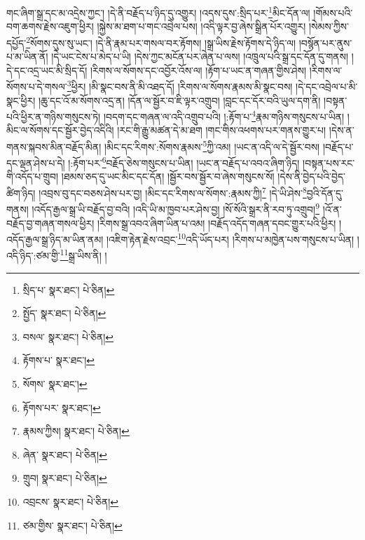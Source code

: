 གང་ཞིག་སྒྲ་དང་མ་འདྲེས་ཀྱང་། །དེ་ནི་བརྗོད་པ་ཉིད་དུ་འགྱུར། །འདས་དུས་:སྲིད་པར་\footnote{སྲིད་པ་  སྣར་ཐང་།  པེ་ཅིན། }མིང་དོན་ལ། །གོམས་པའི་བག་ཆགས་རྗེས་འཇུག་ཕྱིར། །སྐྱེས་མ་ཐག་པ་གང་འབྲེལ་པས། །འདི་ལྟར་བྱ་ཞེས་སྒྲིན་པོར་འགྱུར། །སེམས་ཀྱིས་དཔྱོད་\footnote{སྤྱོད་  སྣར་ཐང་།  པེ་ཅིན། }སོགས་དུས་སུ་ཡང་། །དེ་ནི་རྣམ་པར་གསལ་བར་རྟོགས། །སྒྲ་ཡིས་རྗེས་རྟོགས་དེ་ཉིད་ལ། །བསྙོན་པར་ནུས་པ་མ་ཡིན་ནོ། །དེ་ཡང་ངེས་པ་མེད་པ་ཡི། །དེས་ཀྱང་མངོན་པར་ཞེན་པ་ལས། །འཁྲུལ་པའི་སྒྲ་དང་དོན་དུ་གནས། །དེ་དང་འདྲ་ཡང་མི་སྲིད་དོ། །རིགས་ལ་སོགས་དང་འབྱོར་འོས་ལ། །རྟོག་པ་ཡང་ན་གཞན་གྱིས་ཤེས། །རིགས་ལ་སོགས་པ་དེ་གསལ་\footnote{བསལ་  སྣར་ཐང་།  པེ་ཅིན། }ཕྱིར། །མི་སྣང་བས་ནི་མི་འཐད་དོ། །རིགས་ལ་སོགས་རྣམས་མི་སྣང་བས། །དེ་དང་འབྲེལ་པ་མི་སྣང་ཕྱིར། །ཆུ་དང་འོ་མ་སོགས་འདྲ་ན། །དོན་ལ་སྦྱོར་བ་ཇི་ལྟར་འགྲུབ། །བླང་དང་དོར་བའི་ཡུལ་དག་ནི། །བསྟན་པའི་ཕྱིར་ན་གཉིས་གསུངས་ཏེ། །བདག་དང་གཞན་ལ་འདི་འགྲུབ་པའི། །:རྟོག་པ་\footnote{རྟོགས་པ་  སྣར་ཐང་། }རྣམ་གཉིས་གསུངས་པ་ཡིན། །མིང་ལ་སོགས་དང་སྦྱོར་བྱེད་འདིའི། །རང་གི་རྒྱུ་མཚན་དེ་མ་ཐག །གང་གིས་འཕགས་པར་གནས་གྱུར་པ། །དེས་ན་གནས་སྐབས་མིན་བརྗོད་མིན། །མིང་དང་རིགས་:སོགས་རྣམས་\footnote{སོགས་  སྣར་ཐང་། }ཀྱི་འམ། །ཡང་ན་འདི་ལ་དེ་སྦྱོར་བས། །བརྗོད་པ་དང་ལྡན་ཤེས་པ་དེ། །:རྟོག་པར་\footnote{རྟོགས་པར་  སྣར་ཐང་། }བརྗོད་ཅེས་གསུངས་པ་ཡིན། །ཡང་ན་བརྗོད་པ་འབའ་ཞིག་ཉིད། །བསྟན་པས་རང་གི་འདོད་པ་གྲུབ། །ཐམས་ཅད་དུ་ཡང་མིང་དང་དོན། །སྦྱོར་བས་སྦྱོར་བ་ཞེས་གསུངས་སོ། །དེས་ནི་བྱེད་པའི་བྱེད་ཚིག་ཉིད། །འབྲས་བུ་དང་བཅས་ཤེས་པར་བྱ། །མིང་དང་རིགས་ལ་སོགས་:རྣམས་ཀྱི།\footnote{རྣམས་ཀྱིས།  སྣར་ཐང་།  པེ་ཅིན། } །དེ་ཡི་ཤེས་\footnote{ཞེན་  སྣར་ཐང་།  པེ་ཅིན། }བྱའི་དོན་དུ་གནས། །འདོད་རྒྱལ་སྒྲ་ཡི་བརྗོད་བྱ་བའི། །འདི་ཡི་མ་ཁྱབ་པར་ཤེས་བྱ། །སོ་སོའི་སྒྲར་ནི་རབ་ཏུ་འགྲུབ།\footnote{གྲུབ།  སྣར་ཐང་།  པེ་ཅིན། } །འོ་ན་བརྗོད་བྱ་གཞན་གསལ་ཕྱིར། །རིགས་སྒྲ་འབའ་ཞིག་ཡིན་པ་འམ། །བརྗོད་འདོད་གཞན་དབང་གྱུར་པའི་ཕྱིར། །འདོད་རྒྱལ་སྒྲ་ཉིད་མ་ཡིན་ནམ། །འཇིག་རྟེན་རྗེས་འབྲང་\footnote{འབྲངས་  སྣར་ཐང་།  པེ་ཅིན། }འདི་ཡོད་པར། །རིགས་པ་མཁྱེན་པས་གསུངས་པ་ཡིན། །འདི་ཉིད་:ཙམ་གྱི་\footnote{ཙམ་གྱིས་  སྣར་ཐང་།  པེ་ཅིན། }སྒྲ་ཡིས་ནི། །
